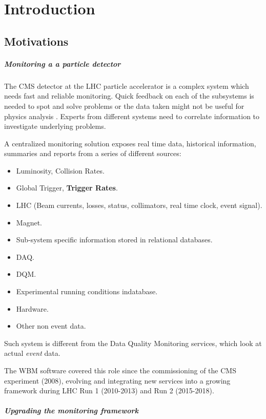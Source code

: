 \chapter{Introduction}

\section{Motivations}

\paragraph{Monitoring a a particle detector} The CMS detector at the LHC particle accelerator is a complex system which needs fast and reliable monitoring. Quick feedback on each of the subsystems is needed to spot and solve problems or the data taken might not be useful for physics analysis \cite{chep2016wbm}. Experts from different systems need to correlate information to investigate underlying problems.

A centralized monitoring solution exposes real time data, historical information, summaries and reports from a series of different sources:

\begin{itemize}
	\item Luminosity, Collision Rates.
	\item Global Trigger, \textbf{Trigger Rates}.
	\item LHC (Beam currents, losses, status, collimators, real time clock, event signal).
	\item Magnet.
	\item Sub-system specific information stored in relational databases.
	\item DAQ.
	\item DQM.
	\item Experimental running conditions indatabase.
	\item Hardware.
	\item Other non event data.
\end{itemize}

Such system is different from the Data Quality Monitoring services, which look at actual \textit{event} data.

The WBM software covered this role since the commissioning of the CMS experiment (2008), evolving and integrating new services into a growing framework during LHC Run 1 (2010-2013) and Run 2 (2015-2018).

\paragraph{Upgrading the monitoring framework} 

